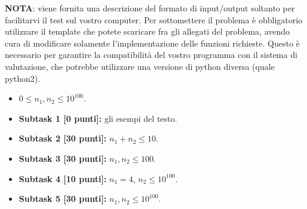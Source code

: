 \textbf{NOTA}: viene fornita una descrizione del formato di input/output soltanto 
per facilitarvi il test sul vostro computer. Per sottomettere il problema è obbligatorio 
utilizzare il template che potete scaricare fra gli allegati del problema, avendo 
cura di modificare solamente l'implementazione delle funzioni richieste. Questo 
è necessario per garantire la compatibilità del vostro programma con il sistema 
di valutazione, che potrebbe utilizzare una versione di python diversa (quale python2).

\Examples
\begin{example}
%
%
%
%
%
\end{example}

\Constraints
\begin{itemize}[nolistsep, noitemsep]
  \item $0 \le n_1, n_2 \le 10^{100}$.
\end{itemize}

\Scoring
\begin{itemize}
  \item \textbf{Subtask 1 [0 punti]:} gli esempi del testo.
  \item \textbf{Subtask 2 [30 punti]:} $n_1+n_2 \leq 10$.
  \item \textbf{Subtask 3 [30 punti]:} $n_1, n_2  \leq 100$.
  \item \textbf{Subtask 4 [10 punti]:} $n_1 = 4$, $n_2 \leq 10^{100}$.
  \item \textbf{Subtask 5 [30 punti]:} $n_1, n_2  \leq 10^{100}$.
\end{itemize}
  
